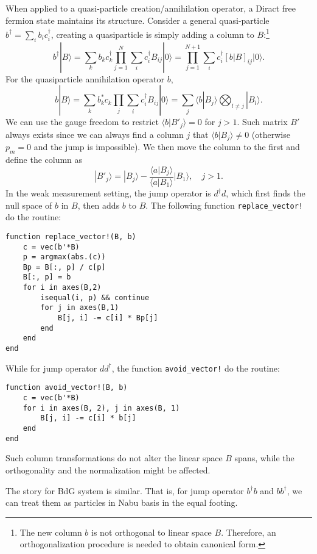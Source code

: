 \documentclass{SciPost}
\begin{document}
When applied to a quasi-particle creation/annihilation operator, a Diract free fermion state maintains its structure. Consider a general quasi-particle $b^\dagger = \sum_i b_i c_i^\dagger$, creating a quasiparticle is simply adding a column to $B$:\footnote{The new column $b$ is not orthogonal to linear space $B$. Therefore, an orthogonalization procedure is needed to obtain canonical form.}
\begin{equation}
	b^\dagger|B\rangle = \sum_k b_k c^\dagger_k \prod_{j=1}^N \sum_i c_i^\dagger B_{ij} |0\rangle
	= \prod_{j=1}^{N+1} \sum_i c_i^\dagger \left[b|B\right]_{ij} |0\rangle.
\end{equation}
For the quasiparticle annihilation operator $b$, 
\begin{equation*}
	b|B\rangle = \sum_k b_k^* c_k \prod_{j} \sum_i c_i^\dagger B_{ij} |0\rangle
	=\sum_j \langle b|B_j\rangle \bigotimes_{l\ne j}|B_l\rangle.
\end{equation*}
We can use the gauge freedom to restrict $\langle b| B'_{j}\rangle = 0$ for $j>1$. Such matrix $B'$ always exists since we can always find a column $j$ that $\langle b| B_{j}\rangle \ne 0$ (otherwise $p_m=0$ and the jump is impossible). We then move the column to the first and define the column as
\begin{equation}
	|B'_{j}\rangle = |B_{j}\rangle - \frac{\langle a|B_{j}\rangle}{\langle a|B_{1}\rangle} |B_{1}\rangle, \quad j>1.
\end{equation}
In the weak measurement setting, the jump operator is $d^\dagger d$, which first finds the null space of $b$ in $B$, then adds $b$ to $B$. The following function \lstinline{replace_vector!} do the routine:
\begin{lstlisting}
function replace_vector!(B, b)
	c = vec(b'*B)
	p = argmax(abs.(c))
	Bp = B[:, p] / c[p]
	B[:, p] = b
	for i in axes(B,2)
		isequal(i, p) && continue
		for j in axes(B,1)
			B[j, i] -= c[i] * Bp[j]
		end
	end
end	
\end{lstlisting}
While for jump operator $dd^\dagger$, the function \lstinline{avoid_vector!} do the routine:
\begin{lstlisting}
function avoid_vector!(B, b)
	c = vec(b'*B)
	for i in axes(B, 2), j in axes(B, 1)
		B[j, i] -= c[i] * b[j]
	end
end
\end{lstlisting}
Such column transformations do not alter the linear space $B$ spans, while the orthogonality and the normalization might be affected.

The story for BdG system is similar. That is, for jump operator $b^\dagger b$ and $b b^\dagger$, we can treat them as particles in Nabu basis in the equal footing.  
\end{document}
